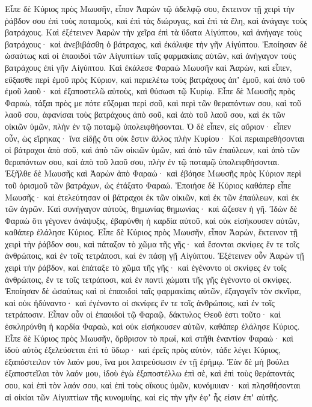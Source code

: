 {Εἶπε δὲ Κύριος πρὸς Μωυσῆν, εἶπον Ἀαρὼν τῷ ἀδελφῷ σου, ἔκτεινον τῇ χειρὶ τὴν ῥάβδον σου ἐπὶ τοὺς ποταμοὺς, καὶ ἐπὶ τὰς διώρυγας, καὶ ἐπὶ τὰ ἕλη, καὶ ἀνάγαγε τοὺς βατράχους.
Καὶ ἐξέτεινεν Ἀαρὼν τὴν χεῖρα ἐπὶ τὰ ὕδατα Αἰγύπτου, καὶ ἀνήγαγε τοὺς βατράχους· καὶ ἀνεβιβάσθη ὁ βάτραχος, καὶ ἐκάλυψε τὴν γῆν Αἰγύπτου.
Ἐποίησαν δὲ ὡσαύτως καὶ οἱ ἐπαοιδοὶ τῶν Αἰγυπτίων ταῖς φαρμακίαις αὐτῶν, καὶ ἀνήγαγον τοὺς βατράχους ἐπὶ γῆν Αἰγύπτου.
Καὶ ἐκάλεσε Φαραὼ Μωυσῆν καὶ Ἀαρὼν, καὶ εἶπεν, εὔξασθε περὶ ἐμοῦ πρὸς Κύριον, καὶ περιελέτω τοὺς βατράχους ἀπʼ ἐμοῦ, καὶ ἀπὸ τοῦ ἐμοῦ λαοῦ· καὶ ἐξαποστελῶ αὐτοὺς, καὶ θύσωσι τῷ Κυρίῳ.
Εἶπε δὲ Μωυσῆς πρὸς Φαραὼ, τάξαι πρὸς με πότε εὔξομαι περὶ σοῦ, καὶ περὶ τῶν θεραπόντων σου, καὶ τοῦ λαοῦ σου, ἀφανίσαι τοὺς βατράχους ἀπὸ σοῦ, καὶ ἀπὸ τοῦ λαοῦ σου, καὶ ἐκ τῶν οἰκιῶν ὑμῶν, πλὴν ἐν τῷ ποταμῷ ὑπολειφθήσονται.
Ὁ δὲ εἶπεν, εἰς αὔριον· εἶπεν οὖν, ὡς εἴρηκας· ἵνα εἰδῇς ὅτι οὐκ ἔστιν ἄλλος πλὴν Κυρίου·
Καὶ περιαιρεθήσονται οἱ βάτραχοι ἀπὸ σοῦ, καὶ ἀπὸ τῶν οἰκιῶν ὑμῶν, καὶ ἀπὸ τῶν ἐπαύλεων, καὶ ἀπὸ τῶν θεραπόντων σου, καὶ ἀπὸ τοῦ λαοῦ σου, πλὴν ἐν τῷ ποταμῷ ὑπολειφθήσονται.
Ἐξῆλθε δὲ Μωυσῆς καὶ Ἀαρὼν ἀπὸ Φαραώ· καὶ ἐβόησε Μωυσῆς πρὸς Κύριον περὶ τοῦ ὁρισμοῦ τῶν βατράχων, ὡς ἐτάξατο Φαραώ.
Ἐποιήσε δὲ Κύριος καθάπερ εἶπε Μωυσῆς· καὶ ἐτελεύτησαν οἱ βάτραχοι ἐκ τῶν οἰκιῶν, καὶ ἐκ τῶν ἐπαύλεων, καὶ ἐκ τῶν ἀγρῶν.
Καὶ συνήγαγον αὐτοὺς, θημωνίας θημωνίας· καὶ ὤζεσεν ἡ γῆ.
Ἰδὼν δὲ Φαραὼ ὅτι γέγονεν ἀνάψυξις, ἐβαρύνθη ἡ καρδία αὐτοῦ, καὶ οὐκ εἰσήκουσεν αὐτῶν, καθάπερ ἐλάλησε Κύριος.
Εἶπε δὲ Κύριος πρὸς Μωυσῆν, εἶπον Ἀαρὼν, ἔκτεινον τῇ χειρὶ τὴν ῥάβδον σου, καὶ πάταξον τὸ χῶμα τῆς γῆς· καὶ ἔσονται σκνίφες ἔν τε τοῖς ἀνθρώποις, καὶ ἐν τοῖς τετράποσι, καὶ ἐν πάσῃ γῇ Αἰγύπτου.
Ἐξέτεινεν οὖν Ἀαρὼν τῇ χειρὶ τὴν ῥάβδον, καὶ ἐπάταξε τὸ χῶμα τῆς γῆς· καὶ ἐγένοντο οἱ σκνίφες ἐν τοῖς ἀνθρώποις, ἔν τε τοῖς τετράποσι, καὶ ἐν παντὶ χώματι τῆς γῆς ἐγένοντο οἱ σκνίφες.
Ἐποίησαν δὲ ὡσαύτως καὶ οἱ ἐπαοιδοὶ ταῖς φαρμακίαις αὐτῶν, ἐξαγαγεῖν τὸν σκνῖφα, καὶ οὐκ ἠδύναντο· καὶ ἐγένοντο οἱ σκνίφες ἔν τε τοῖς ἀνθρώποις, καὶ ἐν τοῖς τετράποσιν.
Εἶπαν οὖν οἱ ἐπαοιδοὶ τῷ Φαραῷ, δάκτυλος Θεοῦ ἐστι τοῦτο· καὶ ἐσκληρύνθη ἡ καρδία Φαραὼ, καὶ οὐκ εἰσήκουσεν αὐτῶν, καθάπερ ἐλάλησε Κύριος.
Εἶπε δὲ Κύριος πρὸς Μωυσῆν, ὄρθρισον τὸ πρωΐ, καὶ στῆθι ἐναντίον Φαραώ· καὶ ἰδοὺ αὐτὸς ἐξελεύσεται ἐπὶ τὸ ὕδωρ· καὶ ἐρεῖς πρὸς αὐτὸν, τάδε λέγει Κύριος, ἐξαπόστειλον τὸν λαόν μου, ἵνα μοι λατρεύσωσιν ἐν τῇ ἐρήμῳ.
Ἐὰν δὲ μὴ βούλει ἐξαποστεῖλαι τὸν λαόν μου, ἰδοὺ ἐγὼ ἐξαποστέλλω ἐπὶ σὲ, καὶ ἐπὶ τοὺς θεράποντάς σου, καὶ ἐπὶ τὸν λαόν σου, καὶ ἐπὶ τοὺς οἴκους ὑμῶν, κυνόμυιαν· καὶ πλησθήσονται αἱ οἰκίαι τῶν Αἰγυπτίων τῆς κυνομυίης, καὶ εἰς τὴν γῆν ἐφʼ ἧς εἰσιν ἐπʼ αὐτῆς.
}
